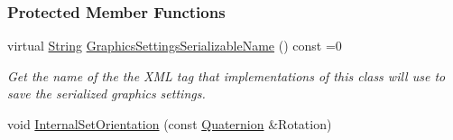 \subsubsection*{Protected Member Functions}
\begin{DoxyCompactItemize}
\item 
virtual \hyperlink{namespaceMezzanine_acf9fcc130e6ebf08e3d8491aebcf1c86}{String} \hyperlink{classMezzanine_1_1NonStaticWorldObject_a641a2f221c0a3fba0f0ffc646d634b31}{GraphicsSettingsSerializableName} () const =0
\begin{DoxyCompactList}\small\item\em Get the name of the the XML tag that implementations of this class will use to save the serialized graphics settings. \item\end{DoxyCompactList}\item 
\hypertarget{classMezzanine_1_1NonStaticWorldObject_a4eb605ae33349a8e31b10dbb2ea87923}{
void \hyperlink{classMezzanine_1_1NonStaticWorldObject_a4eb605ae33349a8e31b10dbb2ea87923}{InternalSetOrientation} (const \hyperlink{classMezzanine_1_1Quaternion}{Quaternion} \&Rotation)}
\label{classMezzanine_1_1NonStaticWorldObject_a4eb605ae33349a8e31b10dbb2ea87923}


\end{DoxyCompactItemize}
